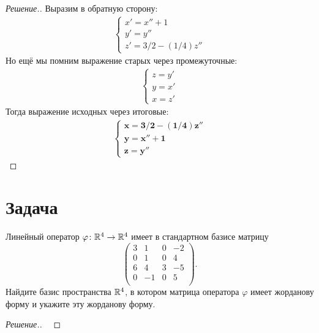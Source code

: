 \documentclass[a4paper]{article}
\theoremstyle{remark}
\begin{document}
\begin{proof}[Решение.]
        Выразим в обратную сторону:
        \begin{align*}
          \begin{cases}
            x' = x'' + 1 \\
            y' = y'' \\
            z' = 3/2 - (1/4)z''
          \end{cases}
        \end{align*}
        Но ещё мы помним выражение старых через промежуточные:
        \begin{align*}
          \begin{cases}
            z = y' \\
            y = x' \\
            x = z'
          \end{cases}
        \end{align*}
        Тогда выражение исходных через итоговые:
        \begin{align*}
          \begin{cases}
            \bm{x = 3/2 - (1/4)z''} \\
            \bm{y = x'' + 1} \\
            \bm{z = y''}
          \end{cases}
        \end{align*}        
        \end{proof}

    \section*{Задача }
        Линейный оператор $\varphi \colon \mathbb{R}^4 \to \mathbb{R}^4$ имеет в стандартном базисе матрицу
        $$
        \begin{pmatrix}
            3 & 1 & 0 & -2 \\
            0 & 1 & 0 & 4 \\
            6 & 4 & 3 & -5 \\
            0 & -1 & 0 & 5 \\
        \end{pmatrix}.
        $$
        Найдите базис пространства $\mathbb{R}^4$, в котором матрица оператора $\varphi$ 
        имеет жорданову форму и укажите эту жорданову форму.
        \begin{proof}[Решение.] \ 
            

        \end{proof}
      
\end{document}
